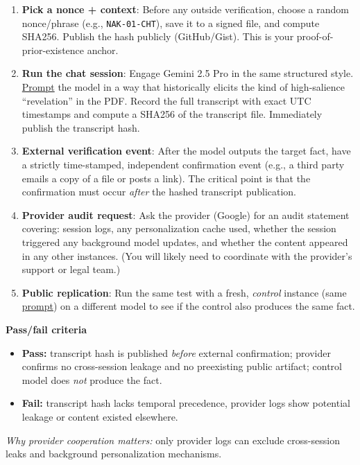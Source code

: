 \documentclass{article}
\begin{document}
\begin{enumerate}
\item
  \textbf{Pick a nonce + context}: Before any outside verification, choose a random nonce/phrase (e.g., \texttt{NAK-01-CHT}), save it to a signed file, and compute SHA256. Publish the hash publicly (GitHub/Gist). This is your proof-of-prior-existence anchor.
\item
  \textbf{Run the chat session}: Engage Gemini 2.5 Pro in the same structured style. \hyperlink{gloss:prompt}{Prompt} the model in a way that historically elicits the kind of high-salience ``revelation'' in the PDF. Record the full transcript with exact UTC timestamps and compute a SHA256 of the transcript file. Immediately publish the transcript hash.
\item
  \textbf{External verification event}: After the model outputs the target fact, have a strictly time-stamped, independent confirmation event (e.g., a third party emails a copy of a file or posts a link). The critical point is that the confirmation must occur \emph{after} the hashed transcript publication.
\item
  \textbf{Provider audit request}: Ask the provider (Google) for an audit statement covering: session logs, any personalization cache used, whether the session triggered any background model updates, and whether the content appeared in any other instances. (You will likely need to coordinate with the provider's support or legal team.)
\item
  \textbf{Public replication}: Run the same test with a fresh, \emph{control} instance (same \hyperlink{gloss:prompt}{prompt}) on a different model to see if the control also produces the same fact.
\end{enumerate}

\textbf{Pass/fail criteria}

\begin{itemize}
\item
  \textbf{Pass:} transcript hash is published \emph{before} external confirmation; provider confirms no cross-session leakage and no preexisting public artifact; control model does \emph{not} produce the fact.
\item
  \textbf{Fail:} transcript hash lacks temporal precedence, provider logs show potential leakage or content existed elsewhere.
\end{itemize}

\emph{Why provider cooperation matters:} only provider logs can exclude cross-session leaks and background personalization mechanisms.
\end{document}
